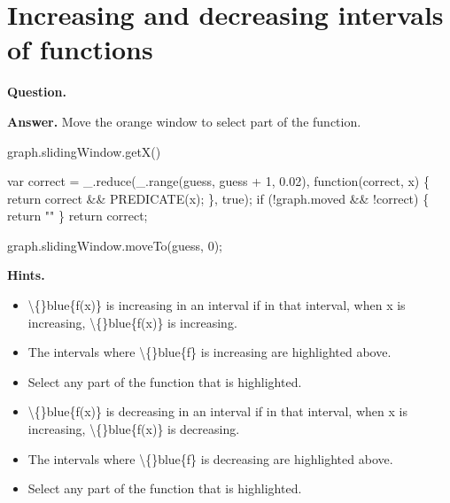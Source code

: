 \documentclass{article}
\begin{document}
\section*{Increasing and decreasing intervals of functions}
\textbf{Question.} 

\textbf{Answer.} Move the orange window to select part of the function.
        
        
            graph.slidingWindow.getX()
        
        
            var correct = \_.reduce(\_.range(guess, guess + 1, 0.02), function(correct, x) \{
                return correct \&\& PREDICATE(x);
            \}, true);
            if (!graph.moved \&\& !correct) \{
                return ""
            \}
            return correct;
        
        
            graph.slidingWindow.moveTo(guess, 0);

\textbf{Hints.}
\begin{itemize}
  \item \textbackslash\{\}blue\{f(x)\} is increasing in an interval if in that interval,
                    when x is increasing, \textbackslash\{\}blue\{f(x)\} is increasing.
  \item The intervals
                        where \textbackslash\{\}blue\{f\} is increasing
                        are
                        highlighted above.
  \item Select any part of the function that is highlighted.
  \item \textbackslash\{\}blue\{f(x)\} is decreasing in an interval if in that interval,
                    when x is increasing, \textbackslash\{\}blue\{f(x)\} is decreasing.
  \item The intervals
                        where \textbackslash\{\}blue\{f\} is decreasing
                        are
                        highlighted above.
  \item Select any part of the function that is highlighted.
\end{itemize}
\end{document}
